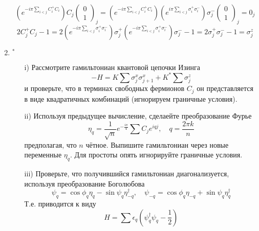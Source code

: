 \documentclass[12pt]{article}
\theoremstyle{definition}
\begin{document}
\begin{enumerate}
\begin{equation}
    \end{equation}
    \begin{equation}
        \left(e^{-i\pi\sum\limits_{i<j}C^+_iC_i}\right)C_j\begin{pmatrix}
            0\\1
        \end{pmatrix}_j=\left(e^{-i\pi\sum\limits_{i<j}C^+_iC_i}\right)\left(e^{i\pi\sum\limits_{i<j}\sigma^+_i\sigma^-_i}\right)\sigma^-_j\begin{pmatrix}
            0\\1
        \end{pmatrix}_j=0_j
    \end{equation}
    \begin{equation}
        2C^+_jC_j-1=2\left(e^{-i\pi\sum\limits_{i<j}\sigma^+_i\sigma^-_i}\right)\sigma^+_j\left(e^{-i\pi\sum\limits_{i<j}\sigma^+_i\sigma^-_i}\right)\sigma^-_j-1=2\sigma^+_j
        \sigma^-_j-1=\sigma^z_j
    \end{equation}
    \item $^*$
    \begin{itemize}
        \item[i)] Рассмотрите гамильтониан квантовой цепочки Изинга
        \begin{equation}
            -H=K\sum\sigma^x_j\sigma^x_{j+1}+K^*\sum\sigma^z_j
        \end{equation}
        и проверьте, что в терминах свободных фермионов $C_j$ он представляется в виде квадратичных комбинаций (игнорируем граничные условия).
        \item[ii)] Используя предыдущее вычисление, сделаейте преобразование Фурье
        \begin{equation}
            \eta_q=\frac{1}{\sqrt{n}}e^{-\frac{i\pi}{4}}\sum C_je^{iqj},\quad q=\frac{2\pi k}{n}
        \end{equation}
        предполагая, что $n$ чётное. Выпишите гамильтониан через новые переменные $\eta_q$. Для простоты опять игнорируйте граничные условия.
        \item[iii)] Проверьте, что получившийся гамильтониан диагонализуется, используя преобразование Боголюбова
        \begin{equation}
            \psi_q=\cos\phi_q\eta_q-\sin\psi_q\eta^\dagger_{-q},\quad\psi_{-q}=\cos\phi_q\eta_{-q}+\sin\psi_q\eta^\dagger_q
        \end{equation}
        Т.е. приводится к виду
        \begin{equation}
            H=\sum\epsilon_q\left(\psi^\dagger_q\psi_q-\frac{1}{2}\right)

\end{equation}
\end{itemize}
\end{enumerate}
\end{document}
